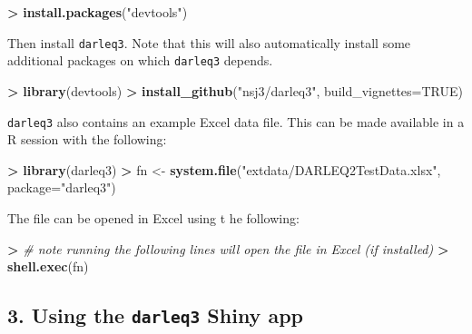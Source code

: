 \documentclass[]{article}
\newenvironment{Shaded}{\begin{snugshade}}{\end{snugshade}}
\newcommand{\KeywordTok}[1]{\textcolor[rgb]{0.13,0.29,0.53}{\textbf{#1}}}
\newcommand{\DataTypeTok}[1]{\textcolor[rgb]{0.13,0.29,0.53}{#1}}
\newcommand{\StringTok}[1]{\textcolor[rgb]{0.31,0.60,0.02}{#1}}
\newcommand{\CommentTok}[1]{\textcolor[rgb]{0.56,0.35,0.01}{\textit{#1}}}
\newcommand{\OtherTok}[1]{\textcolor[rgb]{0.56,0.35,0.01}{#1}}
\newcommand{\OperatorTok}[1]{\textcolor[rgb]{0.81,0.36,0.00}{\textbf{#1}}}
\newcommand{\ErrorTok}[1]{\textcolor[rgb]{0.64,0.00,0.00}{\textbf{#1}}}
\newcommand{\NormalTok}[1]{#1}
\begin{document}
\begin{Shaded}
\begin{Highlighting}[]
\OperatorTok{>}\StringTok{ }\KeywordTok{install.packages}\NormalTok{(}\StringTok{"devtools"}\NormalTok{)}
\end{Highlighting}
\end{Shaded}

Then install \texttt{darleq3}. Note that this will also automatically
install some additional packages on which \texttt{darleq3} depends.

\begin{Shaded}
\begin{Highlighting}[]
\OperatorTok{>}\StringTok{ }\KeywordTok{library}\NormalTok{(devtools)}
\OperatorTok{>}\StringTok{ }\KeywordTok{install_github}\NormalTok{(}\StringTok{"nsj3/darleq3"}\NormalTok{, }\DataTypeTok{build_vignettes=}\OtherTok{TRUE}\NormalTok{)}
\end{Highlighting}
\end{Shaded}

\texttt{darleq3} also contains an example Excel data file. This can be
made available in a R session with the following:

\begin{Shaded}
\begin{Highlighting}[]
\OperatorTok{>}\StringTok{ }\KeywordTok{library}\NormalTok{(darleq3)}
\OperatorTok{>}\StringTok{ }\NormalTok{fn <-}\StringTok{ }\KeywordTok{system.file}\NormalTok{(}\StringTok{"extdata/DARLEQ2TestData.xlsx"}\NormalTok{, }\DataTypeTok{package=}\StringTok{"darleq3"}\NormalTok{)}
\end{Highlighting}
\end{Shaded}

The file can be opened in Excel using t he following:

\begin{Shaded}
\begin{Highlighting}[]
\OperatorTok{>}\StringTok{ }\CommentTok{# note running the following lines will open the file in Excel (if installed)}
\ErrorTok{>}\StringTok{ }\KeywordTok{shell.exec}\NormalTok{(fn)}
\end{Highlighting}
\end{Shaded}

\subsection{\texorpdfstring{3. Using the \texttt{darleq3} Shiny
app}{3. Using the darleq3 Shiny app}}\label{using-the-darleq3-shiny-app}
\end{document}

